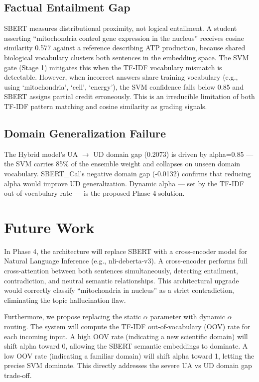 \documentclass[conference]{IEEEtran}
\begin{document}
\subsection{Factual Entailment Gap}
SBERT measures distributional proximity, not logical entailment. A student asserting ``mitochondria control gene expression in the nucleus'' receives cosine similarity 0.577 against a reference describing ATP production, because shared biological vocabulary clusters both sentences in the embedding space. The SVM gate (Stage 1) mitigates this when the TF-IDF vocabulary mismatch is detectable. However, when incorrect answers share training vocabulary (e.g., using `mitochondria', `cell', `energy'), the SVM confidence falls below 0.85 and SBERT assigns partial credit erroneously. This is an irreducible limitation of both TF-IDF pattern matching and cosine similarity as grading signals.

\subsection{Domain Generalization Failure}
The Hybrid model's UA $\to$ UD domain gap (0.2073) is driven by alpha=0.85 — the SVM carries 85\% of the ensemble weight and collapses on unseen domain vocabulary. SBERT\_Cal's negative domain gap (-0.0132) confirms that reducing alpha would improve UD generalization. Dynamic alpha — set by the TF-IDF out-of-vocabulary rate — is the proposed Phase 4 solution.

\section{Future Work}
In Phase 4, the architecture will replace SBERT with a cross-encoder model for Natural Language Inference (e.g., nli-deberta-v3). A cross-encoder performs full cross-attention between both sentences simultaneously, detecting entailment, contradiction, and neutral semantic relationships. This architectural upgrade would correctly classify ``mitochondria in nucleus'' as a strict contradiction, eliminating the topic hallucination flaw.

Furthermore, we propose replacing the static $\alpha$ parameter with dynamic $\alpha$ routing. The system will compute the TF-IDF out-of-vocabulary (OOV) rate for each incoming input. A high OOV rate (indicating a new scientific domain) will shift alpha toward 0, allowing the SBERT semantic embeddings to dominate. A low OOV rate (indicating a familiar domain) will shift alpha toward 1, letting the precise SVM dominate. This directly addresses the severe UA vs UD domain gap trade-off.
\end{document}
